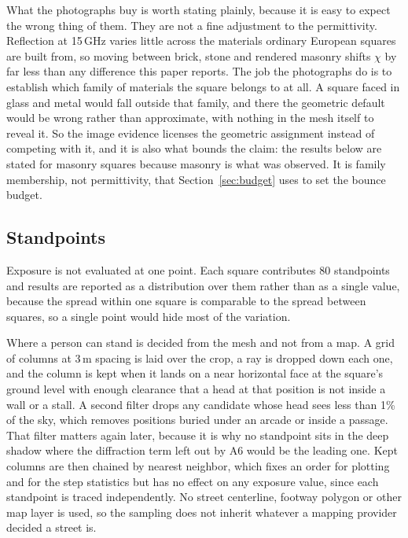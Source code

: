 What the photographs buy is worth stating plainly, because it is easy to expect
the wrong thing of them. They are not a fine adjustment to the permittivity.
Reflection at 15\,GHz varies little across the materials ordinary European
squares are built from, so moving between brick, stone and rendered
masonry shifts $\chi$ by far less than any difference this paper reports. The
job the photographs do is to establish which family of materials the square
belongs to at all. A square faced in glass and metal would fall outside that
family, and there the geometric default would be wrong rather than
approximate, with nothing in the mesh itself to reveal it. So the image evidence
licenses the geometric assignment instead of competing with it, and it is also
what bounds the claim: the results below are stated for masonry squares because
masonry is what was observed. It is family membership, not permittivity, that
Section~\ref{sec:budget} uses to set the bounce budget.

\subsection{Standpoints}
\label{sec:standpoints}

Exposure is not evaluated at one point. Each square contributes 80 standpoints and
results are reported as a distribution over them rather than as a single value,
because the spread within one square is comparable to the spread between
squares, so a single point would hide most of the variation.

Where a person can stand is decided from the mesh and not from a map. A grid of
columns at 3\,m spacing is laid over the crop, a ray is dropped down each one,
and the column is kept when it lands on a near horizontal face at the square's
ground level with enough clearance that a head at that position is not inside a
wall or a stall. A second filter drops any candidate whose head sees less than
1\% of the sky, which removes positions buried under an arcade or inside a
passage. That filter matters again later, because it is why no standpoint sits
in the deep shadow where the diffraction term left out by A6 would be the
leading one. Kept columns are then chained by nearest neighbor, which fixes
an order for plotting and for the step statistics but has no effect on any
exposure value, since each standpoint is traced independently. No street
centerline, footway polygon or other map layer is used, so the sampling does not
inherit whatever a mapping provider decided a street is.

